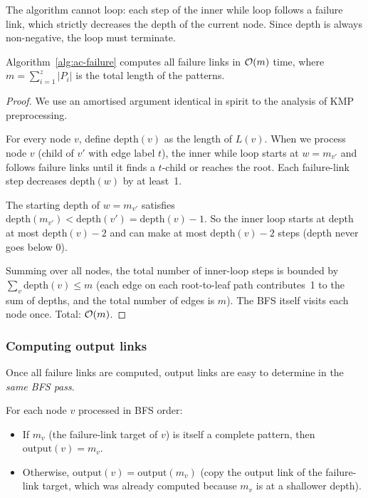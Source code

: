 \begin{observation}
  The algorithm cannot loop: each step of the inner while loop follows
  a failure link, which strictly decreases the depth of the current
  node.
  Since depth is always non-negative, the loop must terminate.
\end{observation}

\begin{formaldetails}
\begin{theorem}
  \label{thm:ac-failure-time}
  Algorithm~\ref{alg:ac-failure} computes all failure links in
  $\mathcal{O}\!\left(m\right)$ time, where $m = \sum_{i=1}^{z} |P_i|$ is the total length
  of the patterns.
\end{theorem}
\begin{proof}
  We use an amortised argument identical in spirit to the analysis of
  KMP preprocessing.

  For every node $v$, define $\mathrm{depth}(v)$ as the length of
  $L(v)$.
  When we process node $v$ (child of $v'$ with edge label $t$), the
  inner while loop starts at $w = m_{v'}$ and follows failure links
  until it finds a $t$-child or reaches the root.
  Each failure-link step decreases $\mathrm{depth}(w)$ by at least~1.

  The starting depth of $w = m_{v'}$ satisfies
  $\mathrm{depth}(m_{v'}) < \mathrm{depth}(v')
   = \mathrm{depth}(v) - 1$.
  So the inner loop starts at depth at most $\mathrm{depth}(v) - 2$
  and can make at most $\mathrm{depth}(v) - 2$ steps (depth never goes
  below 0).

  Summing over all nodes, the total number of inner-loop steps is
  bounded by $\sum_v \mathrm{depth}(v) \le m$ (each edge on each
  root-to-leaf path contributes~1 to the sum of depths, and the total
  number of edges is $m$).
  The BFS itself visits each node once.
  Total: $\mathcal{O}\!\left(m\right)$.
\end{proof}
\end{formaldetails}

\subsubsection{Computing output links}

Once all failure links are computed, output links are easy to
determine in the \emph{same BFS pass}.

For each node $v$ processed in BFS order:
\begin{itemize}[nosep]
  \item If $m_v$ (the failure-link target of $v$) is itself a
        complete pattern, then $\mathrm{output}(v) = m_v$.
  \item Otherwise, $\mathrm{output}(v) = \mathrm{output}(m_v)$
        (copy the output link of the failure-link target, which was
        already computed because $m_v$ is at a shallower depth).
\end{itemize}

